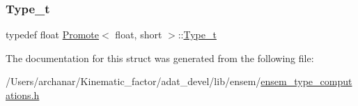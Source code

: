 \subsubsection{\texorpdfstring{Type\_t}{Type\_t}\hspace{0.1cm}{\footnotesize\ttfamily [2/2]}}
{\footnotesize\ttfamily typedef float \mbox{\hyperlink{structPromote}{Promote}}$<$ float, short $>$\+::\mbox{\hyperlink{structPromote_3_01float_00_01short_01_4_a9c8232afdf3f68f947e67d59a16fd670}{Type\+\_\+t}}}



The documentation for this struct was generated from the following file\+:\begin{DoxyCompactItemize}
\item 
/\+Users/archanar/\+Kinematic\+\_\+factor/adat\+\_\+devel/lib/ensem/\mbox{\hyperlink{lib_2ensem_2ensem__type__computations_8h}{ensem\+\_\+type\+\_\+computations.\+h}}\end{DoxyCompactItemize}
